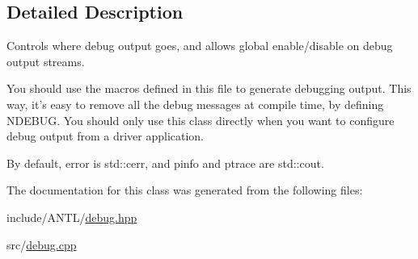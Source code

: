 \subsection{Detailed Description}
Controls where debug output goes, and allows global enable/disable on debug output streams. 

You should use the macros defined in this file to generate debugging output. This way, it's easy to remove all the debug messages at compile time, by defining N\-D\-E\-B\-U\-G. You should only use this class directly when you want to configure debug output from a driver application.

By default, {\ttfamily error} is {\ttfamily std\-::cerr}, and {\ttfamily pinfo} and {\ttfamily ptrace} are {\ttfamily std\-::cout}. 

The documentation for this class was generated from the following files\-:\begin{DoxyCompactItemize}
\item 
include/\-A\-N\-T\-L/\hyperlink{debug_8hpp}{debug.\-hpp}\item 
src/\hyperlink{debug_8cpp}{debug.\-cpp}\end{DoxyCompactItemize}
